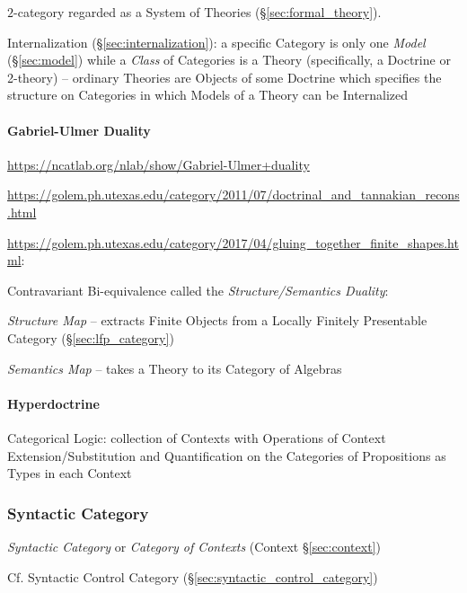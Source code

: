 $2$-category regarded as a System of Theories
(\S\ref{sec:formal_theory}).

Internalization (\S\ref{sec:internalization}): a specific Category is
only one \emph{Model} (\S\ref{sec:model}) while a \emph{Class} of
Categories is a Theory (specifically, a Doctrine or 2-theory) --
ordinary Theories are Objects of some Doctrine which specifies the
structure on Categories in which Models of a Theory can be Internalized



\paragraph{Gabriel-Ulmer Duality}\label{sec:gabriel_ulmer_duality}
\hfill

\url{https://ncatlab.org/nlab/show/Gabriel-Ulmer+duality}

\url{https://golem.ph.utexas.edu/category/2011/07/doctrinal_and_tannakian_recons.html}

\url{https://golem.ph.utexas.edu/category/2017/04/gluing_together_finite_shapes.html}:

Contravariant Bi-equivalence called the \emph{Structure/Semantics
  Duality}:

\emph{Structure Map} -- extracts Finite Objects from a Locally
Finitely Presentable Category (\S\ref{sec:lfp_category})

\emph{Semantics Map} -- takes a Theory to its Category of Algebras



\paragraph{Hyperdoctrine}\label{sec:hyperdoctrine}\hfill

Categorical Logic: collection of Contexts with Operations of Context
Extension/Substitution and Quantification on the Categories of
Propositions as Types in each Context



\subsubsection{Syntactic Category}\label{sec:syntactic_category}

\emph{Syntactic Category} or \emph{Category of Contexts} (Context
\S\ref{sec:context})

\fist Cf. Syntactic Control Category
(\S\ref{sec:syntactic_control_category})

